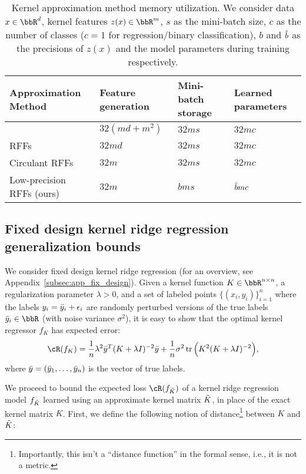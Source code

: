\begin{table}[h]
	\caption{Kernel approximation method memory utilization. We consider data $x\in\RR^d$, kernel features $z(x)\in\RR^m$, $s$ as the mini-batch size, $c$ as the number of classes ($c=1$ for regression/binary classification), 
	$b$ and $\hat{b}$ as the precisions of $z(x)$ and the model parameters during training respectively.
	}
	\label{table:mem-usage}
	\centering
	\begin{tabular}{llll}
		\toprule
		Approximation Method        & Feature generation & Mini-batch storage & Learned parameters \\
		\midrule
		\Nystrom \citep{nystrom}    & $32(md + m^2)$     & $32ms$             & $32mc$ \\
		RFFs \citep{rahimi07random} & $32md$             & $32ms$             & $32mc$ \\
		Circulant RFFs \citep{yu15} & $32m$              & $32ms$             & $32mc$ \\
		Low-precision RFFs (ours)   & $32m$              & $bms$              & $\hat{b} mc$ \\
		\bottomrule
	\end{tabular}
\end{table}
\vsp

\subsection{Fixed design kernel ridge regression generalization bounds}
\label{sec:genbound}
We consider fixed design kernel ridge regression (for an overview, see Appendix~\ref{subsec:app_fix_design}). Given a kernel function $K\in\RR^{n\times n}$, a regularization parameter $\lambda > 0$, and a set of labeled points $\{(x_i,y_i)\}_{i=1}^n$ where the labels $y_i=\bar{y}_i + \epsilon_i$ are randomly perturbed versions of the true labels $\by_i \in \RR$ (with noise variance $\sigma^2$), it is easy to show \citep{alaoui15} that the optimal kernel regressor $f_K$ has expected error:
\begin{eqnarray}
\cR(f_K) = \frac{1}{n}\lambda^2 \by^T(K+\lambda I)^{-2}\by + \frac{1}{n}\sigma^2 \tr\Big(K^2(K+\lambda \id)^{-2}\Big),
\end{eqnarray}
where $\bar{y} = (\bar{y}_1,\ldots,\bar{y}_n)$ is the vector of true labels.

We proceed to bound the expected loss $\cR(f_{\tK})$ of a kernel ridge regression model $f_{\tilde{K}}$ learned using an approximate kernel matrix $\tilde{K}$, in place of the exact kernel matrix $K$. First, we define the following notion of distance\footnote{Importantly, this isn't a ``distance function'' in the formal sense, i.e., it is not a metric.} between $K$ and $\tilde{K}$:

